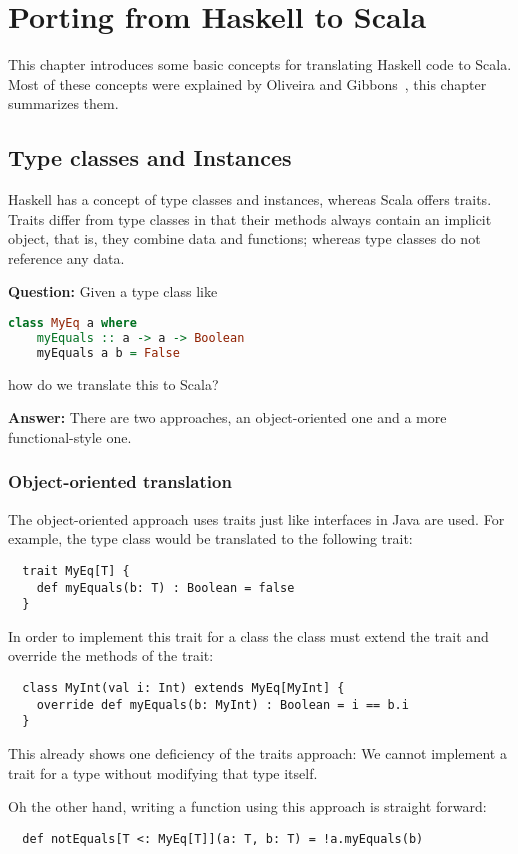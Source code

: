 \chapter{Porting from Haskell to Scala}

This chapter introduces some basic concepts for translating Haskell code
to Scala. Most of these concepts were explained by Oliveira and Gibbons~\cite{scalagp}, this
chapter summarizes them.

\section{Type classes and Instances}

Haskell has a concept of type classes and instances, whereas Scala offers
traits. Traits differ from type classes in that their methods always contain
an implicit  object, that is, they combine data and functions;
whereas type classes do not reference any data.

\textbf{Question:} Given a type class like
\begin{lstlisting}[language=Haskell]
  class MyEq a where
    myEquals :: a -> a -> Boolean
    myEquals a b = False
\end{lstlisting}
how do we translate this to Scala?

\textbf{Answer:} There are two approaches, an object-oriented one and a more
functional-style one.

\subsection{Object-oriented translation}
The object-oriented approach uses traits just like interfaces in
Java are used. For example, the  type class would be translated
to the following trait:
\begin{lstlisting}
  trait MyEq[T] {
    def myEquals(b: T) : Boolean = false
  }
\end{lstlisting}
In order to implement this trait for a class the class must extend the
trait and override the methods of the trait:
\begin{lstlisting}
  class MyInt(val i: Int) extends MyEq[MyInt] {
    override def myEquals(b: MyInt) : Boolean = i == b.i
  }
\end{lstlisting}
This already shows one deficiency of the traits approach: We cannot
implement a trait for a type without modifying that type itself.

Oh the other hand, writing a function using this approach is straight forward:
\begin{lstlisting}
  def notEquals[T <: MyEq[T]](a: T, b: T) = !a.myEquals(b)
\end{lstlisting}

